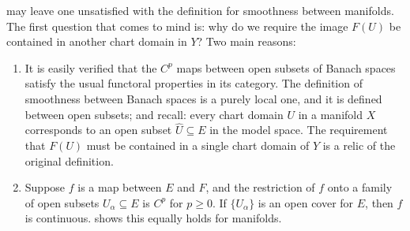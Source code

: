 \documentclass[../main-manifolds.tex]{subfiles}
\begin{document}
 may leave one unsatisfied with the definition for smoothness between manifolds. The first question that comes to mind is: why do we require the image $F(U)$ be contained in another chart domain in $Y$? Two main reasons:

\begin{enumerate}
    \item It is easily verified that the $C^p$ maps between open subsets of Banach spaces satisfy the usual functoral properties in its category. The definition of smoothness between Banach spaces is a purely local one, and it is defined between open subsets; and recall: every chart domain $U$ in a manifold $X$ corresponds to an open subset $\hat{U}\subseteq E$ in the model space. The requirement that $F(U)$ must be contained in a single chart domain of $Y$ is a relic of the original definition.
    \item Suppose $f$ is a map between $E$ and $F$, and the restriction of $f$ onto a family of open subsets $U_{\alpha}\subseteq E$ is $C^p$ for $p\geq 0$. If $\{U_\alpha\}$ is an open cover for $E$, then $f$ is continuous.  shows this equally holds for manifolds.
\end{enumerate}

%
\end{document}
